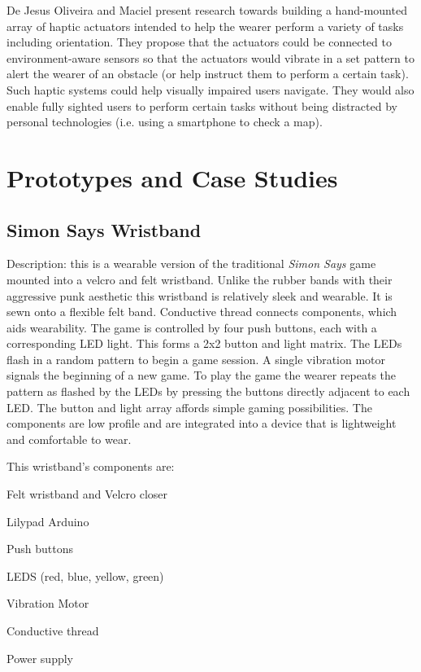 \documentclass{chi-ext}
\begin{document}
De Jesus Oliveira and Maciel \cite{Jesus-Oliveira:2013aa} present research towards building a hand-mounted array of haptic actuators intended to help the wearer perform a variety of tasks including orientation. They propose that the actuators could be connected to environment-aware sensors so that the actuators would vibrate in a set pattern to alert the wearer of an obstacle (or help instruct them to perform a certain task). Such haptic systems could help visually impaired users navigate. They would also enable fully sighted users to perform certain tasks without being distracted by personal technologies (i.e. using a smartphone to check a map).


\section{Prototypes and Case Studies}
\subsection{Simon Says Wristband}
Description: this is a wearable version of the traditional \emph{Simon Says} game mounted into a velcro and felt wristband. Unlike the rubber bands with their aggressive punk aesthetic this wristband is relatively sleek and wearable. It is sewn onto a flexible felt band. Conductive thread connects components, which aids wearability. The game is controlled by four push buttons, each with a corresponding LED light. This forms a 2x2 button and light matrix. The LEDs flash in a random pattern to begin a game session. A single vibration motor signals the beginning of a new game. To play the game the wearer repeats the pattern as flashed by the LEDs by pressing the buttons directly adjacent to each LED. The button and light array affords simple gaming possibilities. The components are low profile and are integrated into a device that is lightweight and comfortable to wear. 

This wristband's components are:
\begin{inparaenum}
\item Felt wristband and Velcro closer
\item Lilypad Arduino
\item Push buttons
\item LEDS (red, blue, yellow, green)
\item Vibration Motor
\item Conductive thread
\item Power supply
\end{inparaenum}
\end{document}
